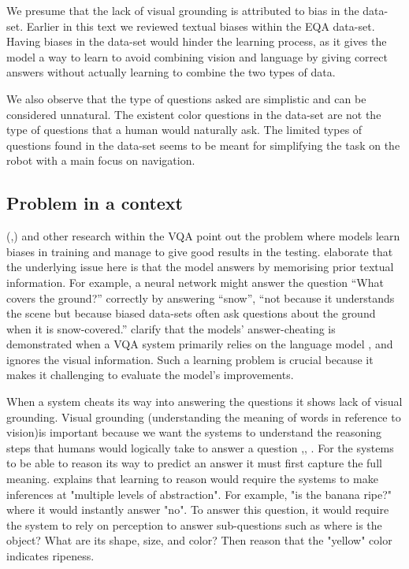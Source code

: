 We presume that the lack of visual grounding  is attributed to bias in the data-set. Earlier in this text we reviewed textual biases within the EQA data-set. Having biases in the data-set would hinder the learning process, as it gives the model a way to learn to avoid combining vision and language  by giving  correct answers without actually learning to combine the two types of data. 

We also observe that the type of questions asked are simplistic and can be considered unnatural. The existent color questions in the data-set are not the type of questions that a human would naturally ask. The limited types of questions found in the data-set seems to be meant for simplifying the task on the robot with a main focus on navigation.


\subsection{Problem in a context}

(\cite{selvaraju2020squinting},\cite {goyal2017making}) and other research within the VQA point out the problem where  models learn biases in training and manage to give good results in the testing.\cite{johnson2017clevr} elaborate that the underlying issue here is that the model answers by memorising prior textual information. For example, a neural network might answer the question “What covers the ground?” correctly by answering “snow”, “not because it understands the scene but because biased data-sets often ask questions about the ground when it is snow-covered.” \cite{fukui2016multimodal} clarify that the models' answer-cheating is demonstrated when a VQA system primarily relies on the language model , and ignores the visual information. Such a learning problem is crucial because it makes it challenging to evaluate the model’s improvements\cite{agrawal2018don}.

When a system cheats its way into answering the questions it shows lack of visual grounding\cite {goyal2017making}. Visual grounding (understanding the meaning of words in reference to vision)is important because we want the systems to understand the reasoning steps that humans would logically take to answer a question \cite{agrawal2016analyzing},\cite{zhang2016yin}, \cite {fukui2016multimodal}. For the systems to be able to reason its way to predict an answer it must first capture the full meaning. \cite{selvaraju2020squinting} explains that learning to reason would require the systems to make inferences at "multiple levels of abstraction". For example, "is the banana ripe?" where it would instantly answer "no".  To answer this question, it would require the system to rely on perception to answer sub-questions such as where is the object? What are its shape, size, and color? Then reason that the "yellow" color indicates ripeness.\cite{selvaraju2020squinting}

